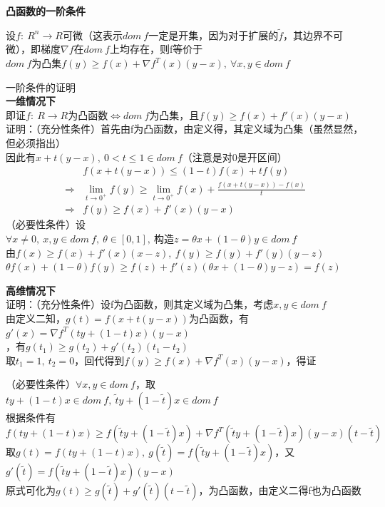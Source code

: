 \documentclass[11pt]{ctexart}         %
\begin{document}
\pagebreak
\begin{large}
	\textbf{凸函数的一阶条件}\\
\end{large}
设$f:\ R^n\to R$可微（这表示$dom\ f$一定是开集，因为对于扩展的$\tilde{f}$，其边界不可微），即梯度$\nabla f$在$dom\ f$上均存在，则f等价于\\
$dom\ f$为凸集\quad {}$f(y)\geq f(x)+\nabla f^T(x)(y-x),\ \forall x,y\in dom\ f$

一阶条件的证明\\
\textbf{一维情况下}\\
即证$f:\ R\to R\text{为凸函数}\Longleftrightarrow dom\ f\text{为凸集，且}f(y)\geq f(x)+f'(x)(y-x)$\\
证明：（充分性条件）{\color{red}首先由f为凸函数，由定义得，其定义域为凸集}（虽然显然，但必须指出）\\
\phantom{证明：}因此有$x+t(y-x),\ 0<t\leq 1 \in dom\ f$（注意是对0是开区间）
\begin{align*}
	&f(x+t(y-x))\leq(1-t)f(x)+tf(y)\\
	\Rightarrow &\lim\limits_{t\to 0^+}f(y)\geq \lim\limits_{t\to 0^+}f(x)+\frac{f(x+t(y-x))-f(x)}{t}\\
	\Rightarrow &f(y)\geq f(x)+f'(x)(y-x)
\end{align*}
\phantom{证明：}（必要性条件）设$\forall x\neq 0,\ x,y\in dom\ f,\ \theta\in[0,1],\ \text{构造}z=\theta x+(1-\theta)y\in dom\ f$\\
\phantom{证明：}由$f(x)\geq f(x)+f'(x)(x-z),\ f(y)\geq f(y)+f'(y)(y-z)$\\
\phantom{证明：}$\theta f(x)+(1-\theta)f(y)\geq f(z)+f'(z)(\theta x+(1-\theta)y-z)=f(z)$

\textbf{高维情况下}\\
证明：（充分性条件）设f为凸函数，则其定义域为凸集，考虑$x,y\in dom\ f$\\
\phantom{证明：}由定义二知，$g(t)=f(x+t(y-x))$为凸函数，有$g'(x)=\nabla f^T(ty+(1-t)x)(y-x)$\\
，有$g(t_1)\geq g(t_2)+g'(t_2)(t_1-t_2)$\\
\phantom{证明：}取$t_1=1,\ t_2=0$，回代得到$f(y)\geq f(x)+\nabla f^T(x)(y-x)$，得证

\phantom{证明：}（必要性条件）$\forall x,y\in dom\ f$，取$ty+(1-t)x\in dom\ f,\ \tilde{t}y+(1-\tilde{t})x\in dom\ f$\\
\phantom{证明：}根据条件有$f(ty+(1-t)x)\geq f(\tilde{t}y+(1-\tilde{t})x)+\nabla f^T(\tilde{t}y+(1-\tilde{t})x)(y-x)(t-\tilde{t})$\\
\phantom{证明：}取$g(t)=f(ty+(1-t)x),\ g(\tilde{t})=f(\tilde{t}y+(1-\tilde{t})x)$，又$g'(\tilde{t})=f(\tilde{t}y+(1-\tilde{t})x)(y-x)$\\
\phantom{证明：}原式可化为$g(t)\geq g(\tilde{t})+g'(\tilde{t})(t-\tilde{t})$，为凸函数，{\color{red}由定义二得}f也为凸函数
\end{document}
